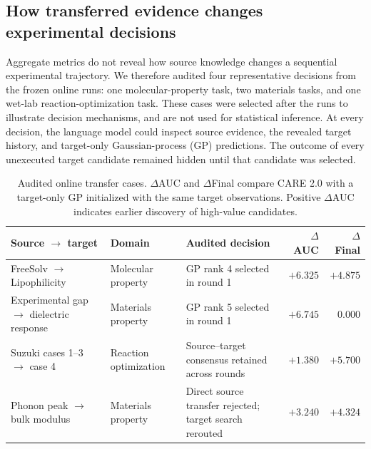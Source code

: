 
\subsection{How transferred evidence changes experimental decisions}
\label{sec:case_studies}

Aggregate metrics do not reveal how source knowledge changes a sequential
experimental trajectory. We therefore audited four representative decisions
from the frozen online runs: one molecular-property task, two materials tasks,
and one wet-lab reaction-optimization task. These cases were selected after the
runs to illustrate decision mechanisms, and are not used for statistical
inference. At every decision, the language model could inspect source evidence,
the revealed target history, and target-only Gaussian-process (GP) predictions.
The outcome of every unexecuted target candidate remained hidden until that
candidate was selected.

\begin{table}[t]
\centering
\small
\caption{Audited online transfer cases. $\Delta$AUC and $\Delta$Final compare
CARE 2.0 with a target-only GP initialized with the same target observations.
Positive $\Delta$AUC indicates earlier discovery of high-value candidates.}
\label{tab:audited_cases}
\begin{tabular}{p{3.2cm}p{3.0cm}p{4.4cm}rr}
\toprule
Source $\rightarrow$ target & Domain & Audited decision & $\Delta$AUC & $\Delta$Final \\
\midrule
FreeSolv $\rightarrow$ Lipophilicity & Molecular property & GP rank 4 selected in round 1 & $+6.325$ & $+4.875$ \\
Experimental gap $\rightarrow$ dielectric response & Materials property & GP rank 5 selected in round 1 & $+6.745$ & $0.000$ \\
Suzuki cases 1--3 $\rightarrow$ case 4 & Reaction optimization & Source--target consensus retained across rounds & $+1.380$ & $+5.700$ \\
Phonon peak $\rightarrow$ bulk modulus & Materials property & Direct source transfer rejected; target search rerouted & $+3.240$ & $+4.324$ \\
\bottomrule
\end{tabular}
\end{table}

